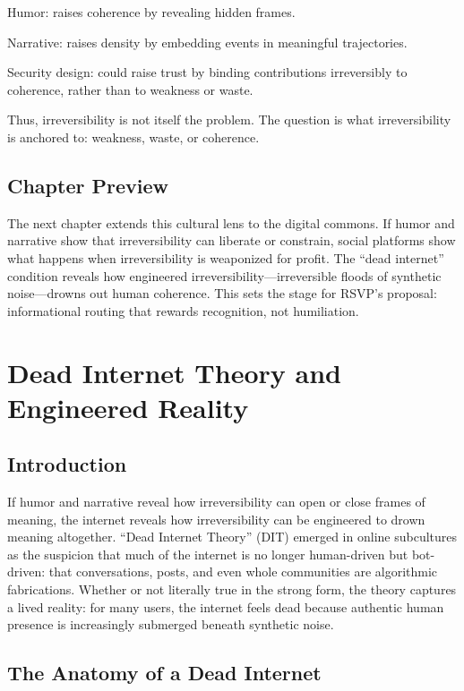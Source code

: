 \documentclass{book}
\begin{document}
Humor: raises coherence by revealing hidden frames.

Narrative: raises density by embedding events in meaningful trajectories.

Security design: could raise trust by binding contributions irreversibly to coherence, rather than to weakness or waste.

Thus, irreversibility is not itself the problem. The question is what irreversibility is anchored to: weakness, waste, or coherence.

\section{Chapter Preview}

The next chapter extends this cultural lens to the digital commons. If humor and narrative show that irreversibility can liberate or constrain, social platforms show what happens when irreversibility is weaponized for profit. The “dead internet” condition reveals how engineered irreversibility—irreversible floods of synthetic noise—drowns out human coherence. This sets the stage for RSVP’s proposal: informational routing that rewards recognition, not humiliation.

\chapter{Dead Internet Theory and Engineered Reality}

\section{Introduction}

If humor and narrative reveal how irreversibility can open or close frames of meaning, the internet reveals how irreversibility can be engineered to drown meaning altogether. “Dead Internet Theory” (DIT) emerged in online subcultures as the suspicion that much of the internet is no longer human-driven but bot-driven: that conversations, posts, and even whole communities are algorithmic fabrications. Whether or not literally true in the strong form, the theory captures a lived reality: for many users, the internet feels dead because authentic human presence is increasingly submerged beneath synthetic noise.

\section{The Anatomy of a Dead Internet}
\end{document}
